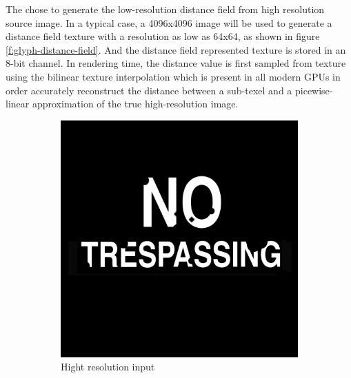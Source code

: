 The chose to generate the low-resolution distance field from high resolution source image. In a typical case, a 4096x4096 image will be used to generate a distance field texture with a resolution as low as 64x64, as shown in figure \ref{f:glyph-distance-field}. And the distance field represented texture is stored in an 8-bit channel. In rendering time, the distance value is first sampled from texture using the bilinear texture interpolation which is present in all modern GPUs in order accurately reconstruct the distance between a sub-texel and a picewise-linear approximation of the true high-resolution image. 

\begin{figure}
	\begin{subfigure}[t]{.48\textwidth}
		\includegraphics[width=1.0\textwidth]{graphics/df/high-resolution-glyph}
		\caption{Hight resolution input}
	\end{subfigure}
	\begin{subfigure}[t]{.48\textwidth}

\end{subfigure}
\end{figure}
